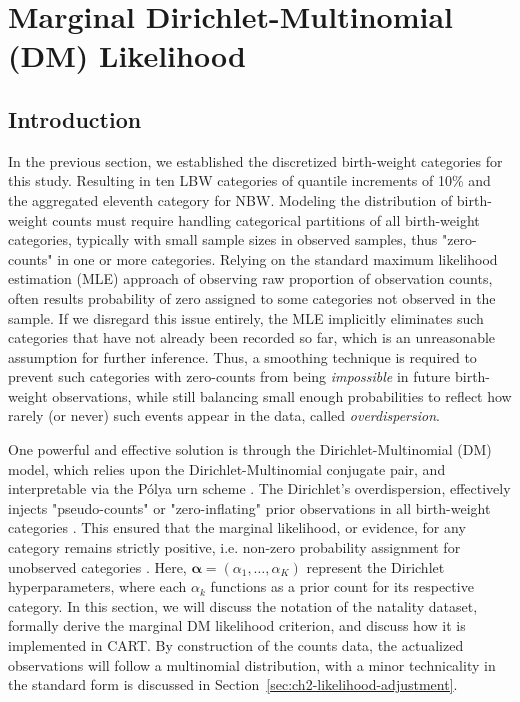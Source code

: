 
\section{Marginal Dirichlet-Multinomial (DM) Likelihood}
\label{sec:ch2-likelihood}
\subsection{Introduction}
\label{sec:ch2-likelihood-introduction}

In the previous section, we established the discretized birth-weight categories for this study. Resulting in ten LBW categories of quantile increments of 10\% and the aggregated eleventh category for NBW. Modeling the distribution of birth-weight counts must require handling categorical partitions of all birth-weight categories, typically with small sample sizes in observed samples, thus "zero-counts" in one or more categories. Relying on the standard maximum likelihood estimation (MLE) approach of observing raw proportion of observation counts, often results probability of zero assigned to some categories not observed in the sample. If we disregard this issue entirely, the MLE implicitly eliminates such categories that have not already been recorded so far, which is an unreasonable assumption for further inference. Thus, a smoothing technique is required to prevent such categories with zero-counts from being \emph{impossible} in future birth-weight observations, while still balancing small enough probabilities to reflect how rarely (or never) such events appear in the data, called \emph{overdispersion}. 

One powerful and effective solution is through the Dirichlet-Multinomial (DM) model, which relies upon the Dirichlet-Multinomial conjugate pair, and interpretable via the Pólya urn scheme \parencite{mimno_polya, gundersen2020dirichlet-multinomial, minka2000estimating}. The Dirichlet's overdispersion, effectively injects "pseudo-counts" or "zero-inflating" prior observations in all birth-weight categories \parencite{mimno_polya, wiki:dirichlet-multinomial}. This ensured that the marginal likelihood, or evidence, for any category remains strictly positive, i.e. non-zero probability assignment for unobserved categories \parencite{wiki:dirichlet-multinomial}. Here, \(\boldsymbol{\alpha} = (\alpha_1, \dots, \alpha_K)\) represent the Dirichlet hyperparameters, where each \(\alpha_k\) functions as a prior count for its respective category. In this section, we will discuss the notation of the natality dataset, formally derive the marginal DM likelihood criterion, and discuss how it is implemented in CART. By construction of the counts data, the actualized observations will follow a multinomial distribution, with a minor technicality in the standard form is discussed in Section~\ref{sec:ch2-likelihood-adjustment}. 

